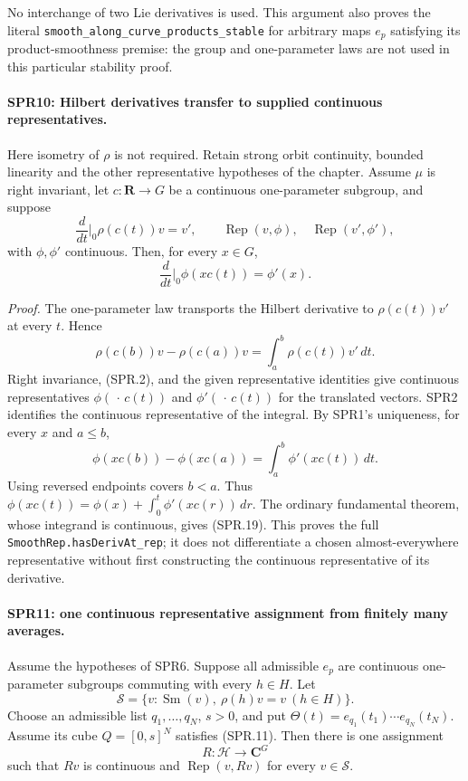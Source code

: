 No interchange of two Lie derivatives is used.  This argument
also proves the literal
\texttt{smooth\_\allowbreak along\_\allowbreak curve\_\allowbreak products\_\allowbreak stable} for arbitrary maps
\(e_p\) satisfying its product-smoothness premise: the group and
one-parameter laws are not used in this particular stability proof.

\paragraph{SPR10: Hilbert derivatives transfer to supplied continuous representatives.}
\label{claim:SPR10}
Here isometry of \(\rho\) is not required.  Retain strong
orbit continuity, bounded linearity and the other representative
hypotheses of the chapter.
Assume \(\mu\) is right invariant, let \(c:\mathbf R\to G\)
be a continuous one-parameter subgroup, and suppose
\[
 \frac{d}{dt}\bigg|_{0}\rho(c(t))v=v',\qquad
 \operatorname{Rep}(v,\phi),\quad
 \operatorname{Rep}(v',\phi'),
\]
with \(\phi,\phi'\) continuous.
Then, for every \(x\in G\),
\[
          \frac{d}{dt}\bigg|_0\phi(xc(t))=\phi'(x).
 \tag{SPR.19}
\]

\emph{Proof.}
The one-parameter law transports the Hilbert derivative to
\(\rho(c(t))v'\) at every \(t\).  Hence
\[
 \rho(c(b))v-\rho(c(a))v
                  =\int_a^b\rho(c(t))v'\,dt.
\]
Right invariance, (SPR.2), and the given representative identities
give continuous representatives \(\phi(\,\cdot\,c(t))\) and
\(\phi'(\,\cdot\,c(t))\) for the translated vectors.
SPR2 identifies the continuous representative of the integral.
By SPR1's uniqueness, for every \(x\) and \(a\le b\),
\[
 \phi(xc(b))-\phi(xc(a))
                    =\int_a^b\phi'(xc(t))\,dt.
 \tag{SPR.20}
\]
Using reversed endpoints covers \(b<a\).
Thus
\(\phi(xc(t))=\phi(x)+\int_0^t\phi'(xc(r))\,dr\).
The ordinary fundamental theorem, whose integrand is continuous,
gives (SPR.19).  This proves the full
\texttt{SmoothRep.\allowbreak hasDerivAt\_\allowbreak rep}; it does not differentiate a
chosen almost-everywhere representative without first constructing
the continuous representative of its derivative.

\paragraph{SPR11: one continuous representative assignment from finitely many averages.}
\label{claim:SPR11}
Assume the hypotheses of SPR6.  Suppose all admissible \(e_p\)
are continuous one-parameter subgroups commuting with every
\(h\in H\).  Let
\[
 \mathcal S=\{v:\operatorname{Sm}(v),\ \rho(h)v=v\ (h\in H)\}.
\]
Choose an admissible list \(q_1,\ldots,q_N\), \(s>0\), and put
\(\Theta(t)=e_{q_1}(t_1)\cdots e_{q_N}(t_N)\).
Assume its cube \(Q=[0,s]^N\) satisfies (SPR.11).
Then there is one assignment
\[
                     R:\mathcal H\longrightarrow\mathbf C^G
\]
such that \(Rv\) is continuous and
\(\operatorname{Rep}(v,Rv)\) for every \(v\in\mathcal S\).


